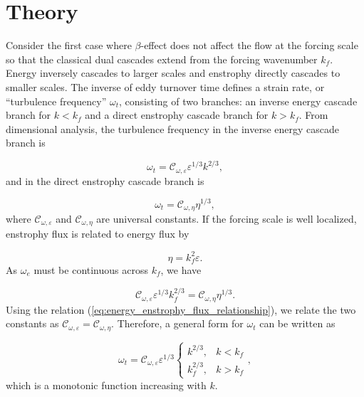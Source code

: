 \documentclass{ametsoc}
\begin{document}
\section{Theory}

Consider the first case where $\beta$-effect does not affect the flow at the forcing
scale so that the classical dual cascades extend from the forcing
wavenumber $k_{f}$. Energy inversely cascades to larger scales and
enstrophy directly cascades to smaller scales. The inverse of eddy
turnover time defines a strain rate, or ``turbulence frequency''
$\omega_{t}$, consisting of two branches: an inverse energy cascade
branch for $k<k_{f}$ and a direct enstrophy cascade branch for $k>k_{f}$.
From dimensional analysis, the turbulence frequency in the inverse
energy cascade branch is

\begin{equation}
\omega_{t}=\mathcal{C}_{\omega,\varepsilon}\varepsilon^{1/3}k^{2/3},\label{eq:eddy_turnover_freq_inverse_cascade}
\end{equation}
and in the direct enstrophy cascade branch is

\begin{equation}
\omega_{t}=\mathcal{C}_{\omega,\eta}\eta^{1/3},\label{eq:eddy_turnover_freq_direct_enstrophy_cascade}
\end{equation}
where $\mathcal{C}_{\omega,\varepsilon}$ and $\mathcal{C}_{\omega,\eta}$
are universal constants. If the forcing scale is well localized, enstrophy
flux is related to energy flux by

\begin{equation}
\eta=k_{f}^{2}\varepsilon.\label{eq:energy_enstrophy_flux_relationship}
\end{equation}
As $\omega_{e}$ must be continuous across $k_{f}$, we have

\[
\mathcal{C}_{\omega,\varepsilon}\varepsilon^{1/3}k_{f}^{2/3}=\mathcal{C}_{\omega,\eta}\eta^{1/3}.
\]
Using the relation (\ref{eq:energy_enstrophy_flux_relationship}),
we relate the two constants as $\mathcal{C}_{\omega,\varepsilon}=\mathcal{C}_{\omega,\eta}$.
Therefore, a general form for $\omega_{t}$ can be written as

\begin{equation}
\omega_{t}=\mathcal{C}_{\omega,\varepsilon}\varepsilon^{1/3}\begin{cases}
k^{2/3}, & k<k_{f}\\
k_{f}^{2/3}, & k>k_{f}
\end{cases},\label{eq:eddy_turnover_freq_general_form}
\end{equation}
which is a monotonic function increasing with $k$.
\end{document}
